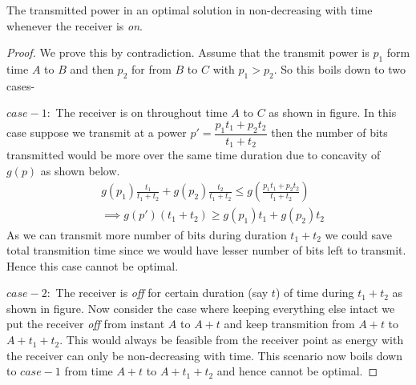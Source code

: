 \begin{lemma}
The transmitted power in an optimal solution in non-decreasing with time whenever the receiver is \textit{on}.
\label{increasing_power}
\end{lemma}
\begin{proof}
We prove this by contradiction. Assume that the transmit power is $p_1$ form time $A$ to $B$ and then $p_2$ for from $B$ to $C$ with $p_1>p_2$. So this boils down to two cases-

$case-1:$ The receiver is on throughout time $A$ to $C$ as shown in figure. In this case suppose we transmit at a power $p'=\dfrac{p_1t_1+p_2t_2}{t_1+t_2}$ then the number of bits transmitted would be more over the same time duration due to concavity of $g(p)$ as shown below.
\begin{align}
&g(p_1)\frac{t_1}{t_1+t_2}+g(p_2)\frac{t_2}{t_1+t_2} \le g(\frac{p_1t_1+p_2t_2}{t_1+t_2})
\\
&\implies g(p')(t_1+t_2)\ge g(p_1)t_1+g(p_2)t_2  
\end{align}
As we can transmit more number of bits during duration $t_1+t_2$ we could save total transmition time since we would have lesser number of bits left to transmit. Hence this case cannot be optimal.

$case-2:$ The receiver is \textit{off} for certain duration (say $t$) of time during $t_1+t_2$ as shown in figure. Now consider the case where keeping everything else intact we put the receiver \textit{off} from instant $A$ to $A+t$ and keep transmition from $A+t$ to $A+t_1+t_2$. This would always be feasible from the receiver point as energy with the receiver can only be non-decreasing with time. This scenario now boils down to $case-1$ from time $A+t$ to $A+t_1+t_2$ and hence cannot be optimal.
\end{proof}

